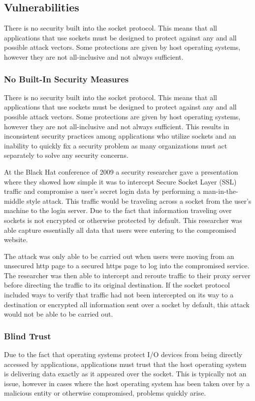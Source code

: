 \documentclass[conference, 12pt]{IEEEtran}
\begin{document}
\subsection{Vulnerabilities}
There is no security built into the socket protocol. This means that all applications that use sockets must be designed to protect against any and all possible attack vectors. Some protections are given by host operating systems, however they are not all-inclusive and not always sufficient.

\subsubsection{No Built-In Security Measures}
There is no security built into the socket protocol. This means that all applications that use sockets must be designed to protect against any and all possible attack vectors. Some protections are given by host operating systems, however they are not all-inclusive and not always sufficient. This results in inconsistent security practices among applications who utilize sockets and an inability to quickly fix a security problem as many organizations must act separately to solve any security concerns.

At the Black Hat conference of 2009 a security researcher gave a presentation where they showed how simple it was to intercept Secure Socket Layer (SSL) traffic and compromise a user’s secret login data by performing a man-in-the-middle style attack\cite{17}. This traffic would be traveling across a socket from the user’s machine to the login server. Due to the fact that information traveling over sockets is not encrypted or otherwise protected by default. This researcher was able capture essentially all data that users were entering to the compromised website.

The attack was only able to be carried out when users were moving from an unsecured http page to a secured https page to log into the compromised service. The researcher was then able to intercept and reroute traffic to their proxy server before directing the traffic to its original destination\cite{17}. If the socket protocol included ways to verify that traffic had not been intercepted on its way to a destination or encrypted all information sent over a socket by default, this attack would not be able to be carried out.

\subsubsection{Blind Trust}
Due to the fact that operating systems protect I/O devices from being directly accessed by applications, applications must trust that the host operating system is delivering data exactly as it appeared over the socket\cite{15}. This is typically not an issue, however in cases where the host operating system has been taken over by a malicious entity or otherwise compromised, problems quickly arise.
\end{document}

